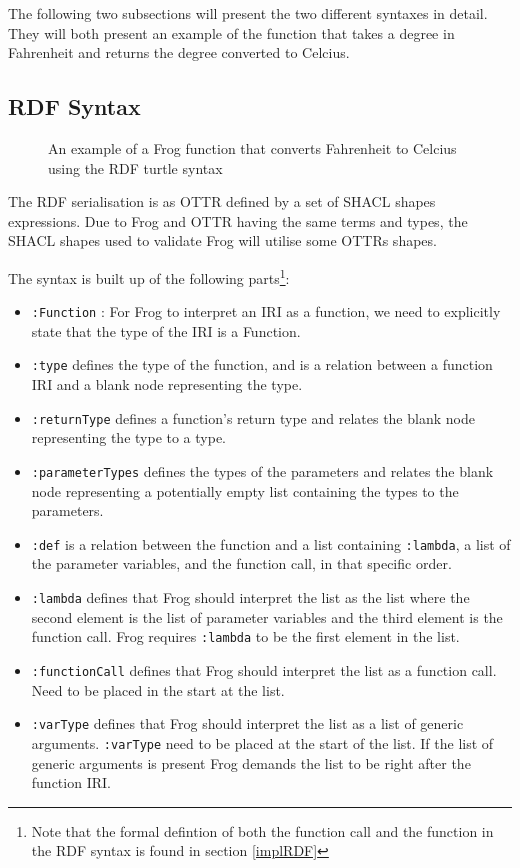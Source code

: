 \para 
The following two subsections will present the two different syntaxes in detail. They will both present an example of the function that takes a degree in Fahrenheit and returns the degree converted to Celcius. 

\subsection{RDF Syntax}
\label{RDF_syntax}

\begin{figure}[b]
    
    \caption{An example of a Frog function that converts Fahrenheit to Celcius using the RDF turtle syntax}
    \label{fig:rdf_example}
\end{figure}

\para
The RDF serialisation is as OTTR defined by a set of SHACL shapes expressions. Due to Frog and OTTR having the same terms and types, the SHACL shapes used to validate Frog will utilise some OTTRs shapes. 

\para
The syntax is built up of the following parts\footnote{Note that the formal defintion of both the function call and the function in the RDF syntax is found in section \ref{implRDF}}: 

\begin{itemize}
    \item \lstinline{:Function} : For Frog to interpret an IRI as a function, we need to explicitly state that the type of the IRI is a Function. 
    \item \lstinline{:type} defines the type of the function, and is a relation between a function IRI and a blank node representing the type.
    \item \lstinline{:returnType} defines a function's return type and relates the blank node representing the type to a type. 
    \item \lstinline{:parameterTypes} defines the types of the parameters and relates the blank node representing a potentially empty list containing the types to the parameters.
    \item \lstinline{:def} is a relation between the function and a list containing \lstinline{:lambda}, a list of the parameter variables, and the function call, in that specific order. 
    \item \lstinline{:lambda} defines that Frog should interpret the list as the list where the second element is the list of parameter variables and the third element is the function call. Frog requires \lstinline{:lambda} to be the first element in the list. 
    \item \lstinline{:functionCall} defines that Frog should interpret the list as a function call. Need to be placed in the start at the list. 
    \item \lstinline{:varType} defines that Frog should interpret the list as a list of generic arguments. \lstinline{:varType} need to be placed at the start of the list. If the list of generic arguments is present Frog demands the list to be right after the function IRI. 
  
\end{itemize}


